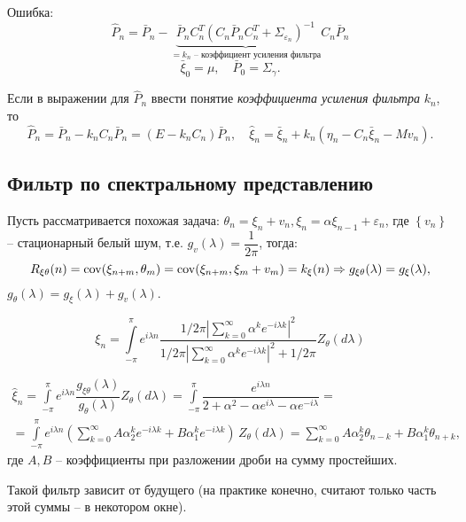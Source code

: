 Ошибка:
\[
  \hat{P}_n = \bar{P}_n - \underbrace{\bar{P}_n C_n^T (C_n \bar{P}_n C_n^T + \Sigma_{\varepsilon_n})^{-1}}_\text{$=k_n$ -- коэффициент усиления фильтра} C_n \bar{P}_n
\]
\[
  \bar{\xi}_0 = \mu, \quad
  \bar{P}_0 = \Sigma_\gamma.
\]

Если в выражении для $\hat{P}_n$ ввести понятие \emph{коэффициента усиления фильтра} $k_n$, то
\[
  \hat{P}_n = \bar{P}_n - k_n C_n \bar{P}_n = (E - k_n C_n) \bar{P}_n, \quad
  \hat{\xi}_n = \bar{\xi}_n + k_n (\eta_n - C_n \bar{\xi}_n - Mv_n).
\]

\subsection{Фильтр по спектральному представлению}

Пусть рассматривается похожая задача:
$\theta_n = \xi_n + v_n, \xi_n = \alpha \xi_{n-1} + \varepsilon_n$, где 
$ \left\{ v_n \right\} $ -- стационарный белый шум, т.е. $g_v(\lambda) = \dfrac{1}{2\pi}$, 
тогда:
\[
  R_{\xi\theta}(n) = \operatorname{cov}(\xi_{n+m}, \theta_m) = \operatorname{cov}(\xi_{n+m}, \xi_m + v_m) = k_\xi(n)
  \Rightarrow
  g_{\xi\theta} (\lambda) = g_\xi(\lambda),
\]
$g_\theta(\lambda) = g_\xi(\lambda) + g_v(\lambda)$.

\[
  \xi_n = \int\limits_{-\pi}^\pi e^{i\lambda n} \dfrac{1/2\pi \left| \sum_{k=0}^\infty \alpha^k e^{-i\lambda k} \right|^2}{1/2\pi \left| \sum_{k=0}^\infty \alpha^k e^{-i\lambda k} \right|^2 + 1/2\pi} Z_\theta(d\lambda) 
\]

\begin{multline*}
  \hat{\xi}_n =
  \int\limits_{-\pi}^\pi e^{i\lambda n} \dfrac{g_{\xi\theta} (\lambda)}{g_\theta(\lambda)} Z_\theta(d\lambda) =
  \int\limits_{-\pi}^\pi \dfrac{e^{i\lambda n}}{2 + \alpha^2 - \alpha e^{i\lambda} - \alpha e^{-i\lambda}} = \\
  = \int\limits_{-\pi}^\pi e^{i\lambda n} \left( \sum_{k=0}^\infty A\alpha_2^k e^{-i\lambda k} + B \alpha_1^k e^{- i\lambda k} \right) \, Z_\theta(d\lambda) =
  \sum_{k=0}^\infty A \alpha_2^k \theta_{n-k} + B \alpha_1^k \theta_{n+k},
\end{multline*}
где $A, B$ -- коэффициенты при разложении дроби на сумму простейших.

Такой фильтр зависит от будущего (на практике конечно, считают только часть этой суммы -- в некотором окне).

